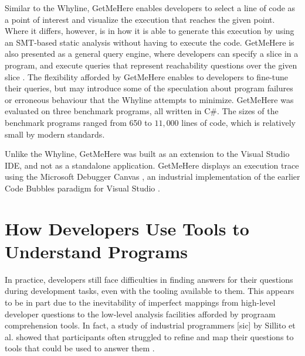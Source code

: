 \par Similar to the Whyline, GetMeHere enables developers to select a line of 
code as a point of interest and visualize the execution that reaches the given 
point.
Where it differs, however, is in how it is able to generate this execution
by using an SMT-based static analysis \cite{barnett-2014-get} without having to
execute the code.
GetMeHere is also presented as a general query engine, where developers can
specify a slice in a program, and execute queries that represent reachability
questions over the given slice \cite{barnett-2014-get}.
The flexibility afforded by GetMeHere enables to developers to fine-tune their
queries, but may introduce some of the speculation about program failures or
erroneous behaviour that the Whyline attempts to minimize.
GetMeHere was evaluated on three benchmark programs, all written in C\#.
The sizes of the benchmark programs ranged from 650 to $11,000$ lines of code,
which is relatively small by modern standards.

\par Unlike the Whyline, GetMeHere was built as an extension to the Visual
Studio \ac{IDE}, and not as a standalone application.
GetMeHere displays an execution trace using the Microsoft Debugger Canvas 
\cite{bragdon-2012-canvas}, an industrial implementation of the earlier 
Code Bubbles \cite{bragdon-2010-code-bubbles} paradigm for Visual Studio
\cite{barnett-2014-get}.

\section{How Developers Use Tools to Understand Programs}
\label{sec:HowDevelopersUseToolsToUnderstandPrograms}

\noindent In practice, developers still face difficulties in finding answers 
for their questions during development tasks, even with the tooling available 
to them.
This appears to be in part due to the inevitability of imperfect mappings from
high-level developer questions to the low-level analysis facilities afforded
by prograam comprehension tools.
In fact, a study of industrial programmers [sic] by Sillito et al. showed that 
participants often struggled to refine and map their questions to tools
that could be used to answer them \cite{sillito-2006-questions-during-task}.

